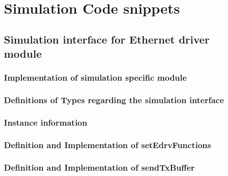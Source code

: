 \chapter{Simulation Code snippets}
\label{app:simulation}

\section{Simulation interface for Ethernet driver module}
\label{app:simulation_edrv}

\subsection{Implementation of simulation specific module}
\label{app:simulation_edrv_target}


\subsection{Definitions of Types regarding the simulation interface}
\label{app:simulation_edrv_functions}


\subsection{Instance information}
\label{app:simulation_edrv_interface_instance}



\subsection{Definition and Implementation of setEdrvFunctions}
\label{app:simulation_edrv_interface_setfunc}




\subsection{Definition and Implementation of sendTxBuffer}
\label{app:simulation_edrv_interface_sendtx}



